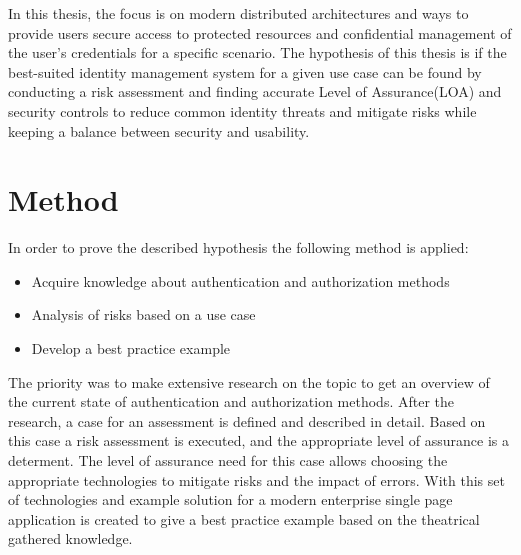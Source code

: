 In this thesis, the focus is on modern distributed architectures and ways to provide users secure access to protected resources and confidential management of the user’s credentials for a specific scenario. The hypothesis of this thesis is if the best-suited identity management system for a given use case can be found by conducting a risk assessment and finding accurate Level of Assurance(LOA) and security controls to reduce common identity threats and mitigate risks while keeping a balance between security and usability.

\section{Method}

In order to prove the described hypothesis the following method is applied:

\begin{itemize}
	\item Acquire knowledge about authentication and authorization methods
	\item Analysis of risks based on a use case
	\item Develop a best practice example
\end{itemize}

The priority was to make extensive research on the topic to get an overview of the current state of authentication and authorization methods. After the research, a case for an assessment is defined and described in detail. Based on this case a risk assessment is executed, and the appropriate level of assurance is a determent. The level of assurance need for this case allows choosing the appropriate technologies to mitigate risks and the impact of errors. With this set of technologies and example solution for a modern enterprise single page application is created to give a best practice example based on the theatrical gathered knowledge.


\chapterend
